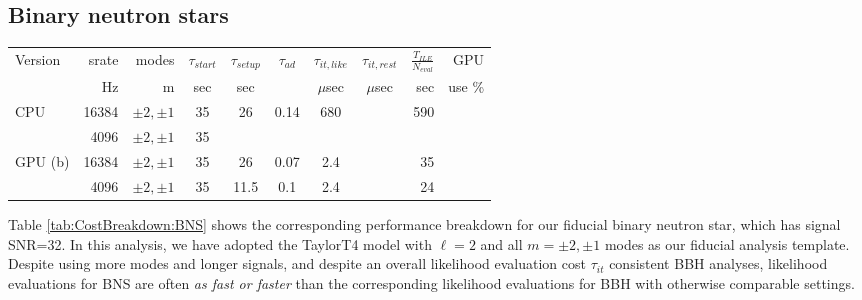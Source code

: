 \documentclass[twocolumn,prd,nofootinbib]{revtex4}
\newcommand\unit[1]{{\rm #1}}
\begin{document}
\subsection{Binary neutron stars}
\begin{table*}
\begin{tabular}{lrr|ccccc|rr}
Version & srate & modes & $\tau_{start}$ & $\tau_{setup}$ & $\tau_{ad}$ & $\tau_{it,like}$ &$\tau_{it,rest}$ &
$\frac{T_{ILE}}{N_{eval}}$ & GPU \\  %
  &   Hz & m & sec & sec & & $\mu$sec & $\mu$sec  &sec  & use  \%\\ \hline 
CPU & 16384 & $\pm 2,\pm 1 $ & 35 & 26 & 0.14  & 680  & & 590    \\ 
       & 4096 & $\pm 2, \pm 1$ & 35 & &  &   &&  & \\ \hline
GPU (b) & 16384 & $\pm 2, \pm 1$   & 35 & 26 & 0.07 &  2.4 & &35 &  \\
       & 4096 & $ \pm 2, \pm 1 $        &  35  & 11.5 & 0.1 &  2.4  & &24 & \\ \hline
\end{tabular}
\caption{\label{tab:CostBreakdown:BNS}\textbf{Profiling performance: Binary neutron stars}: Evaluation costs for the
  marginalized likelihood on default
  hardware,  analysing $T=8\unit{s}$ of data with a binary neutron stars
  $m_1=1.4 M_\odot,M_2=1.35 M_\odot$, with convergence threshold $n_{\rm eff} > 50$.
}
\end{table*}

Table \ref{tab:CostBreakdown:BNS} shows the corresponding performance breakdown for our fiducial binary neutron star,
which has signal SNR=32.  In this analysis, we have adopted the TaylorT4 model with $\ell=2$ and all $m=\pm 2,\pm 1$ modes as our
fiducial analysis template.   Despite using more modes and longer signals, and despite an overall likelihood evaluation
cost $\tau_{it}$ consistent BBH analyses,  likelihood evaluations for BNS are often
\emph{as fast or faster} than the corresponding likelihood evaluations for BBH with otherwise comparable settings.
\end{document}
